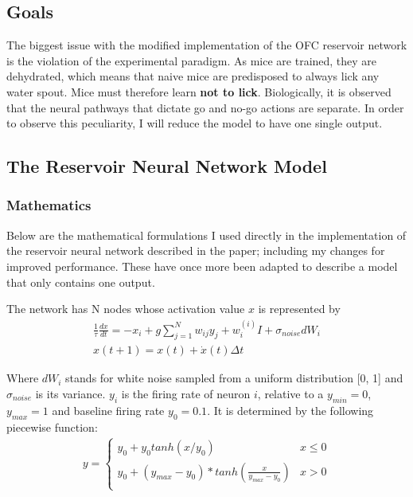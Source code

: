 \documentclass[11pt]{article}
\begin{document}
\hypertarget{goals}{%
\subsection{Goals}\label{goals}}

The biggest issue with the modified implementation of the OFC reservoir
network is the violation of the experimental paradigm. As mice are
trained, they are dehydrated, which means that naive mice are
predisposed to always lick any water spout. Mice must therefore learn
\textbf{not to lick}. Biologically, it is observed that the neural
pathways that dictate go and no-go actions are separate. In order to
observe this peculiarity, I will reduce the model to have one single
output.

\hypertarget{the-reservoir-neural-network-model}{%
\subsection{The Reservoir Neural Network
Model}\label{the-reservoir-neural-network-model}}

\hypertarget{mathematics}{%
\subsubsection{Mathematics}\label{mathematics}}

Below are the mathematical formulations I used directly in the
implementation of the reservoir neural network described in the paper;
including my changes for improved performance. These have once more been
adapted to describe a model that only contains one output.

The network has N nodes whose activation value \(x\) is represented by
\begin{align}
\frac{1}{\tau} \frac{dx}{dt}= -x_i + g \sum_{j=1}^N w_{ij} y_j + w_i^{(i)}I + \sigma_{noise}dW_i \\
x(t + 1) = x(t) + \dot{x}(t)\Delta t
\end{align}

Where \(dW_i\) stands for white noise sampled from a uniform
distribution {[}0, 1{]} and \(\sigma_{noise}\) is its variance. \(y_i\)
is the firing rate of neuron \(i\), relative to a \(y_{min}=0\),
\(y_{max}=1\) and baseline firing rate \(y_0 = 0.1\). It is determined
by the following piecewise function: \begin{align}
y=   \left\{
\begin{array}{ll}
      y_0 + y_0 tanh(x/y_0) & x \leq 0   \\
      y_0 + (y_{max} - y_0)*tanh(\frac{x}{y_{max}- y_0}) & x > 0 \\
\end{array} 
\right.
\end{align}
\end{document}
